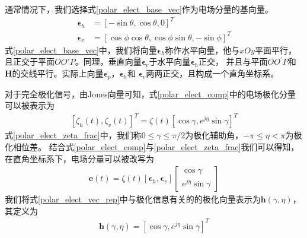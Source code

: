 \documentclass[master]{thesis-uestc}
\begin{document}
通常情况下，我们选择式\eqref{polar_elect_base_vec}作为电场分量的基向量。
\begin{subequations}\label{polar_elect_base_vec}
    \begin{align}
        \bm{\epsilon}_{h} &=[-\sin \theta, \cos \theta, 0]^{T} \\
        \bm{\epsilon}_{v} &=[\cos \phi \cos \theta, \cos \phi \sin \theta,-\sin \phi]^{T}
    \end{align}
\end{subequations}
式\eqref{polar_elect_base_vec}中，我们将向量$\bm{\epsilon}_h$称作水平向量，他与$xOy$平面平行，
且正交于平面$OO\prime P$。同理，垂直向量$\bm{\epsilon}_v$于水平向量$\bm{\epsilon}_h$正交，
并且与平面$OO^\prime P$和$\bm{H}$的交线平行。实际上向量$\bm{\epsilon}_p$，$\bm{\epsilon}_h$和
$\bm{\epsilon}_v$两两正交，且构成一个直角坐标系。

对于完全极化信号，由Jones向量可知，式\eqref{polar_elect_comp}中的电场极化分量可以被表示为
\begin{equation}\label{polar_elect_zeta_frac}
    \begin{aligned}
        \left[\zeta_{h}(t), \zeta_{v}(t)\right]^{T}=\zeta(t)\left[\cos \gamma, e^{j \eta} \sin \gamma\right]^{T}
    \end{aligned}
\end{equation}
式\eqref{polar_elect_zeta_frac}中，我们称$0\le\gamma\le\pi/2$为极化辅助角，$-\pi\le\eta<\pi$为极化相位差。
结合式\eqref{polar_elect_comp}与\eqref{polar_elect_zeta_frac}我们可以得知，在直角坐标系下，电场分量可以被改写为
\begin{equation}\label{polar_elect_vec_rep}
    \begin{aligned}
        \boldsymbol{e}(t)=\zeta(t)\left[\boldsymbol{\epsilon}_{h}, \boldsymbol{\epsilon}_{v}\right]
        \left[\begin{array}{c}
            \cos \gamma \\
            e^{j \eta} \sin \gamma
            \end{array}
        \right]
    \end{aligned}
\end{equation}
我们将式\eqref{polar_elect_vec_rep}中与极化信息有关的的极化向量表示为$\bm{h}(\gamma,\eta)$，其定义为
\begin{equation}\label{polar_vec}
    \begin{aligned}
        \bm{h}(\gamma, \eta)=\left[\cos \gamma, e^{j \eta} \sin \gamma\right]^{T}
    \end{aligned}
\end{equation}
\end{document}
